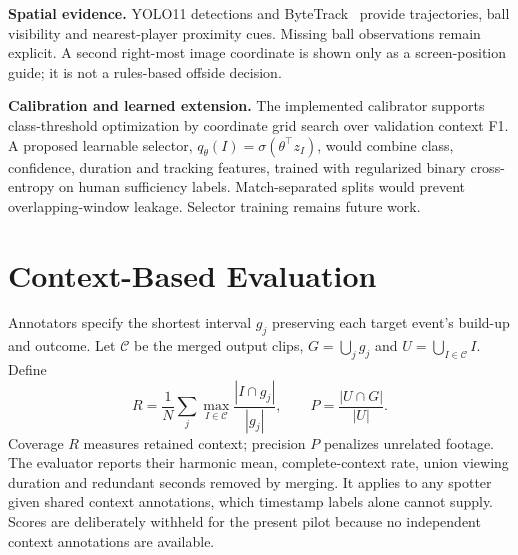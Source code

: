 \documentclass[10pt,twocolumn,letterpaper]{article}
\begin{document}
\textbf{Spatial evidence.} YOLO11 detections and ByteTrack~\cite{bytetrack} provide trajectories, ball visibility and nearest-player proximity cues. Missing ball observations remain explicit. A second right-most image coordinate is shown only as a screen-position guide; it is not a rules-based offside decision.

\textbf{Calibration and learned extension.} The implemented calibrator supports class-threshold optimization by coordinate grid search over validation context F1. A proposed learnable selector, $q_\theta(I)=\sigma(\theta^\top z_I)$, would combine class, confidence, duration and tracking features, trained with regularized binary cross-entropy on human sufficiency labels. Match-separated splits would prevent overlapping-window leakage. Selector training remains future work.

\section{Context-Based Evaluation}
Annotators specify the shortest interval $g_j$ preserving each target event's build-up and outcome. Let $\mathcal C$ be the merged output clips, $G=\bigcup_jg_j$ and $U=\bigcup_{I\in\mathcal C}I$. Define
\begin{equation}
 R=\frac1N\sum_j\max_{I\in\mathcal C}\frac{|I\cap g_j|}{|g_j|},
 \qquad P=\frac{|U\cap G|}{|U|}.
\end{equation}
Coverage $R$ measures retained context; precision $P$ penalizes unrelated footage. The evaluator reports their harmonic mean, complete-context rate, union viewing duration and redundant seconds removed by merging. It applies to any spotter given shared context annotations, which timestamp labels alone cannot supply. Scores are deliberately withheld for the present pilot because no independent context annotations are available.
\end{document}
